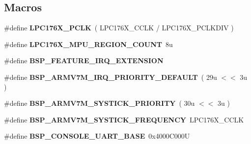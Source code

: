 \subsection*{Macros}
\begin{DoxyCompactItemize}
\item 
\mbox{\label{group__RTEMSBSPsARMLPC176X_gae90d07b91be93820cc65974981bcba28}} 
\#define {\bfseries L\+P\+C176\+X\+\_\+\+P\+C\+LK}~( L\+P\+C176\+X\+\_\+\+C\+C\+LK / L\+P\+C176\+X\+\_\+\+P\+C\+L\+K\+D\+IV )
\item 
\mbox{\label{group__RTEMSBSPsARMLPC176X_gaf2aba02b21594c1359722299359fe66b}} 
\#define {\bfseries L\+P\+C176\+X\+\_\+\+M\+P\+U\+\_\+\+R\+E\+G\+I\+O\+N\+\_\+\+C\+O\+U\+NT}~8u
\item 
\mbox{\label{group__RTEMSBSPsARMLPC176X_ga5d7d631d3a14b7554160f14eb42f351b}} 
\#define {\bfseries B\+S\+P\+\_\+\+F\+E\+A\+T\+U\+R\+E\+\_\+\+I\+R\+Q\+\_\+\+E\+X\+T\+E\+N\+S\+I\+ON}
\item 
\mbox{\label{group__RTEMSBSPsARMLPC176X_ga8cbce037173a026946db0e4628939104}} 
\#define {\bfseries B\+S\+P\+\_\+\+A\+R\+M\+V7\+M\+\_\+\+I\+R\+Q\+\_\+\+P\+R\+I\+O\+R\+I\+T\+Y\+\_\+\+D\+E\+F\+A\+U\+LT}~( 29u $<$$<$ 3u )
\item 
\mbox{\label{group__RTEMSBSPsARMLPC176X_gaabc09d01f675047eb59c49fc7282017d}} 
\#define {\bfseries B\+S\+P\+\_\+\+A\+R\+M\+V7\+M\+\_\+\+S\+Y\+S\+T\+I\+C\+K\+\_\+\+P\+R\+I\+O\+R\+I\+TY}~( 30u $<$$<$ 3u )
\item 
\mbox{\label{group__RTEMSBSPsARMLPC176X_ga484f5ed3be718d51567e87bcbca4783f}} 
\#define {\bfseries B\+S\+P\+\_\+\+A\+R\+M\+V7\+M\+\_\+\+S\+Y\+S\+T\+I\+C\+K\+\_\+\+F\+R\+E\+Q\+U\+E\+N\+CY}~L\+P\+C176\+X\+\_\+\+C\+C\+LK
\item 
\mbox{\label{group__RTEMSBSPsARMLPC176X_ga079b62d123214293876069996b7665a6}} 
\#define {\bfseries B\+S\+P\+\_\+\+C\+O\+N\+S\+O\+L\+E\+\_\+\+U\+A\+R\+T\+\_\+\+B\+A\+SE}~0x4000\+C000U
\end{DoxyCompactItemize}
